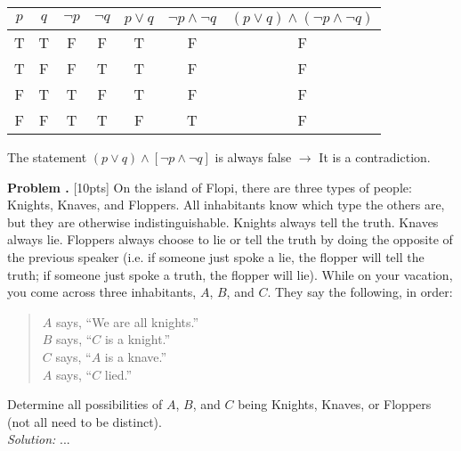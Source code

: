 \documentclass[10pt]{article}
\newcounter{problem}
\newcommand{\problem}{\textbf{\refstepcounter{problem}Problem \theproblem.} }
\renewcommand{\lor}{\vee}
\renewcommand{\land}{\wedge}
\begin{document}
\begin{center}
    \begin{tabular}{|c|c|c|c|c|c|c|}
        \hline 
        \textbf{$p$} & \textbf{$q$} & \textbf{$\neg p$} & \textbf{$\neg q$} &
        \textbf{$p \lor q$}  & \textbf{$\neg p \land \neg q$} & \textbf{$(p \lor q) \land (\neg p \land \neg q)$}\\
        \hline
        T & T & F & F & T & F & F \\
        \hline
        T & F & F & T & T & F & F \\
        \hline
        F & T & T & F & T & F & F \\
        \hline
        F & F & T & T & F & T & F \\
        \hline
    \end{tabular}
    \bigbreak
    The statement $(p \lor q) \land [\lnot p \land \lnot q]$ is always false $\rightarrow$ It is a contradiction.
\end{center}



\clearpage
\problem [10pts] On the island of Flopi, there are three types of people: Knights, Knaves, and Floppers.
All inhabitants know which type the others are, but they are otherwise indistinguishable.
Knights always tell the truth. Knaves always lie.
Floppers always choose to lie or tell the truth by doing the opposite of the previous speaker
(i.e. if someone just spoke a lie, the flopper will tell the truth; if someone just spoke a truth, the flopper will lie).
While on your vacation, you come across three inhabitants, $A$, $B$, and $C$.
They say the following, in order:
\begin{quote}
    $A$ says, ``We are all knights.''\\
    $B$ says, ``$C$ is a knight.''\\
    $C$ says, ``$A$ is a knave.''\\
    $A$ says, ``$C$ lied.''
\end{quote}
Determine all possibilities of $A$, $B$, and $C$ being Knights, Knaves, or Floppers (not all need to be distinct).\\
\bigbreak
\textit{Solution:} ...
\end{document}
